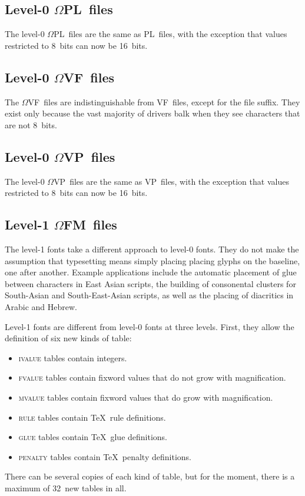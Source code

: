 \documentclass[fleqn]{article}
\newcommand{\OMEGA}{$\Omega$}
\newcommand{\OFM}{\OMEGA FM}
\newcommand{\PL}{PL}
\newcommand{\VF}{VF}
\newcommand{\VP}{VP}
\newcommand{\OPL}{\OMEGA PL}
\newcommand{\OVF}{\OMEGA VF}
\newcommand{\OVP}{\OMEGA VP}
\begin{document}
\subsection{Level-0 \OPL\ files}

The level-0 \OPL\ files are the same as \PL\ files, with the exception
that values restricted to 8~bits can now be 16~bits.

\subsection{Level-0 \OVF\ files}

The \OVF\ files are indistinguishable from \VF\ files,
except for the file suffix.  They exist only because
the vast majority of drivers balk when they see
characters that are not 8~bits.

\subsection{Level-0 \OVP\ files}

The level-0 \OVP\ files are the same as \VP\ files, with the exception
that values restricted to 8~bits can now be 16~bits.

\subsection{Level-1 \OFM\ files}

The level-1 fonts take a different approach to level-0 fonts.  They do
not make the assumption that typesetting means simply placing
placing glyphs on the baseline, one after another.  Example
applications include the automatic placement of glue between characters
in East Asian scripts, the building of consonental clusters for
South-Asian and South-East-Asian scripts, as well as the placing of
diacritics in Arabic and Hebrew.

Level-1 fonts are different from level-0 fonts at three levels.  First, they
allow the definition of six new kinds of table:
\begin{itemize}
\item \textsc{ivalue} tables contain integers.
\item \textsc{fvalue} tables contain fixword values that do not grow with
magnification.
\item \textsc{mvalue} tables contain fixword values that do grow with
magnification.
\item \textsc{rule} tables contain \TeX\ rule definitions.
\item \textsc{glue} tables contain \TeX\ glue definitions.
\item \textsc{penalty} tables contain \TeX\ penalty definitions.
\end{itemize}
There can be several copies of each kind of table, but for the moment,
there is a maximum of 32~new tables in all.
\end{document}
